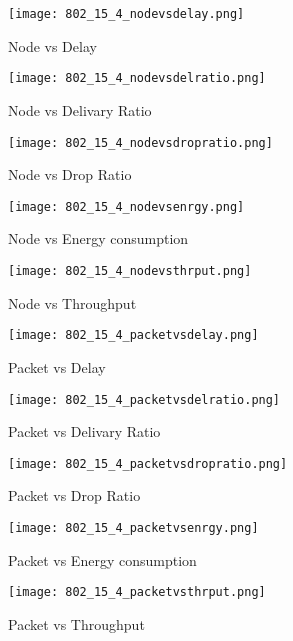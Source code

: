 \documentclass{report}
\begin{document}
\begin{figure}
  \caption{Node vs Delay}
  \centering
    \texttt{[image: 802\_15\_4\_nodevsdelay.png]}
\end{figure}
\begin{figure}
  \caption{Node vs Delivary Ratio}
  \centering
    \texttt{[image: 802\_15\_4\_nodevsdelratio.png]}
\end{figure}
\begin{figure}
  \caption{Node vs Drop Ratio}
  \centering
    \texttt{[image: 802\_15\_4\_nodevsdropratio.png]}
\end{figure}
\begin{figure}
  \caption{Node vs Energy consumption}
  \centering
    \texttt{[image: 802\_15\_4\_nodevsenrgy.png]}
\end{figure}
\begin{figure}
  \caption{Node vs Throughput}
  \centering
    \texttt{[image: 802\_15\_4\_nodevsthrput.png]}
\end{figure}

\begin{figure}
  \caption{Packet vs Delay}
  \centering
    \texttt{[image: 802\_15\_4\_packetvsdelay.png]}
\end{figure}
\begin{figure}
  \caption{Packet vs Delivary Ratio}
  \centering
    \texttt{[image: 802\_15\_4\_packetvsdelratio.png]}
\end{figure}
\begin{figure}
  \caption{Packet vs Drop Ratio}
  \centering
    \texttt{[image: 802\_15\_4\_packetvsdropratio.png]}
\end{figure}
\begin{figure}
  \caption{Packet vs Energy consumption}
  \centering
    \texttt{[image: 802\_15\_4\_packetvsenrgy.png]}
\end{figure}
\begin{figure}
  \caption{Packet vs Throughput}
  \centering
    \texttt{[image: 802\_15\_4\_packetvsthrput.png]}
\end{figure}
\end{document}
